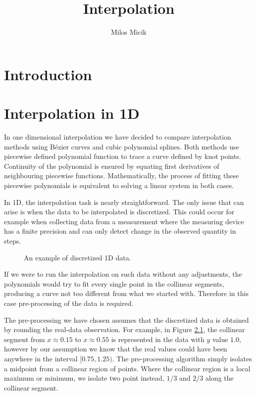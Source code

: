 \documentclass[a4paper,10pt]{report}
\title{Interpolation} %
\author{Milos Micik}
\begin{document}
\maketitle

\begin{abstract}
\end{abstract}

\chapter{Introduction}

\chapter{Interpolation in 1D}
In one dimensional interpolation we have decided to compare interpolation methods using Bézier curves and cubic polynomial splines. Both methods use piecewise defined polynomial function to trace a curve defined by knot points. Continuity of the polynomial is ensured by equating first derivatives of neighbouring piecewise functions. Mathematically, the process of fitting these piecewise polynomials is equivalent to solving a linear system in both cases.

In 1D, the interpolation task is nearly straightforward. The only issue that can arise is when the data to be interpolated is discretized. This could occur for example when collecting data from a measurement where the measuring device has a finite precision and can only detect change in the observed quantity in steps.
\begin{figure}[h]
 \centering
 
 \caption{An example of discretized 1D data.}
 \label{fig:1D_fun}
\end{figure}

If we were to run the interpolation on such data without any adjustments, the polynomials would try to fit every single point in the collinear segments, producing a curve not too different from what we started with. Therefore in this case pre-processing of the data is required.

The pre-processing we have chosen assumes that the discretized data is obtained by rounding the real-data observation. For example, in Figure \ref{fig:1D_fun}, the collinear segment from $x\approx0.15$ to $x\approx0.55$ is represented in the data with $y$ value $1.0$, however by our assumption we know that the real values could have been anywhere in the interval $[0.75, 1.25)$. The pre-processing algorithm simply isolates a midpoint from a collinear region of points. Where the collinear region is a local maximum or minimum, we isolate two point instead, $1/3$ and $2/3$ along the collinear segment.
\end{document}
